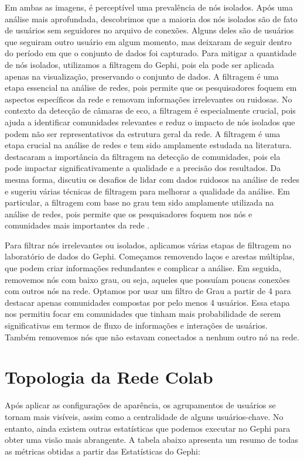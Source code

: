 Em ambas as imagens, é perceptível uma prevalência de nós isolados. Após uma análise mais aprofundada, descobrimos que a maioria dos nós isolados são de fato de usuários sem seguidores no arquivo de conexões. Alguns deles são de usuários que seguiram outro usuário em algum momento, mas deixaram de seguir dentro do período em que o conjunto de dados foi capturado. Para mitigar a quantidade de nós isolados, utilizamos a filtragem do Gephi, pois ela pode ser aplicada apenas na visualização, preservando o conjunto de dados. A filtragem é uma etapa essencial na análise de redes, pois permite que os pesquisadores foquem em aspectos específicos da rede e removam informações irrelevantes ou ruidosas. No contexto da detecção de câmaras de eco, a filtragem é especialmente crucial, pois ajuda a identificar comunidades relevantes e reduz o impacto de nós isolados que podem não ser representativos da estrutura geral da rede. A filtragem é uma etapa crucial na análise de redes e tem sido amplamente estudada na literatura.
 destacaram a importância da filtragem na detecção de comunidades, pois ela pode impactar significativamente a qualidade e a precisão dos resultados. Da mesma forma,  discutiu os desafios de lidar com dados ruidosos na análise de redes e sugeriu várias técnicas de filtragem para melhorar a qualidade da análise. Em particular, a filtragem com base no grau tem sido amplamente utilizada na análise de redes, pois permite que os pesquisadores foquem nos nós e comunidades mais importantes da rede \cite[]{2002_Borgatti}.

Para filtrar nós irrelevantes ou isolados, aplicamos várias etapas de filtragem no laboratório de dados do Gephi. Começamos removendo laços e arestas múltiplas, que podem criar informações redundantes e complicar a análise. Em seguida, removemos nós com baixo grau, ou seja, aqueles que possuíam poucas conexões com outros nós na rede. Optamos por usar um filtro de Grau a partir de 4 para destacar apenas comunidades compostas por pelo menos 4 usuários. Essa etapa nos permitiu focar em comunidades que tinham mais probabilidade de serem significativas em termos de fluxo de informações e interações de usuários. Também removemos nós que não estavam conectados a nenhum outro nó na rede.

\section{Topologia da Rede Colab}
Após aplicar as configurações de aparência, os agrupamentos de usuários se tornam mais visíveis, assim como a centralidade de alguns usuários-chave. No entanto, ainda existem outras estatísticas que podemos executar no Gephi para obter uma visão mais abrangente. A tabela abaixo apresenta um resumo de todas as métricas obtidas a partir das Estatísticas do Gephi:

